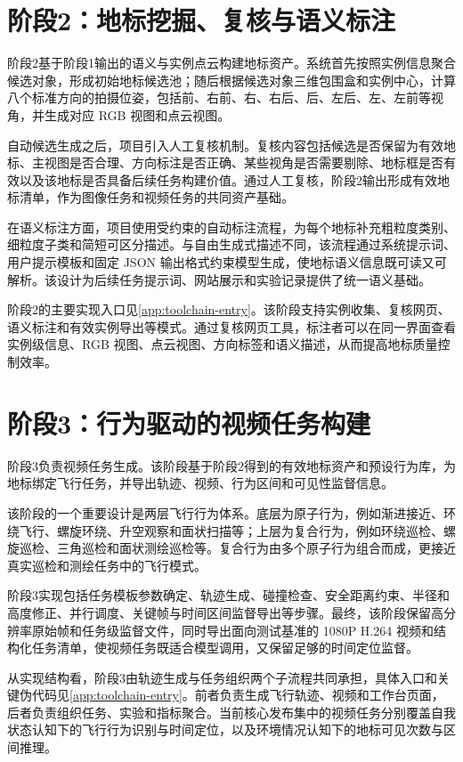 \section{阶段2：地标挖掘、复核与语义标注}

阶段2基于阶段1输出的语义与实例点云构建地标资产。系统首先按照实例信息聚合候选对象，形成初始地标候选池；随后根据候选对象三维包围盒和实例中心，计算八个标准方向的拍摄位姿，包括前、右前、右、右后、后、左后、左、左前等视角，并生成对应 RGB 视图和点云视图。

自动候选生成之后，项目引入人工复核机制。复核内容包括候选是否保留为有效地标、主视图是否合理、方向标注是否正确、某些视角是否需要剔除、地标框是否有效以及该地标是否具备后续任务构建价值。通过人工复核，阶段2输出形成有效地标清单，作为图像任务和视频任务的共同资产基础。

在语义标注方面，项目使用受约束的自动标注流程，为每个地标补充粗粒度类别、细粒度子类和简短可区分描述。与自由生成式描述不同，该流程通过系统提示词、用户提示模板和固定 JSON 输出格式约束模型生成，使地标语义信息既可读又可解析。该设计为后续任务提示词、网站展示和实验记录提供了统一语义基础。

阶段2的主要实现入口见\autoref{app:toolchain-entry}。该阶段支持实例收集、复核网页、语义标注和有效实例导出等模式。通过复核网页工具，标注者可以在同一界面查看实例级信息、RGB 视图、点云视图、方向标签和语义描述，从而提高地标质量控制效率。

\section{阶段3：行为驱动的视频任务构建}

阶段3负责视频任务生成。该阶段基于阶段2得到的有效地标资产和预设行为库，为地标绑定飞行任务，并导出轨迹、视频、行为区间和可见性监督信息。

该阶段的一个重要设计是两层飞行行为体系。底层为原子行为，例如渐进接近、环绕飞行、螺旋环绕、升空观察和面状扫描等；上层为复合行为，例如环绕巡检、螺旋巡检、三角巡检和面状测绘巡检等。复合行为由多个原子行为组合而成，更接近真实巡检和测绘任务中的飞行模式。

阶段3实现包括任务模板参数确定、轨迹生成、碰撞检查、安全距离约束、半径和高度修正、并行调度、关键帧与时间区间监督导出等步骤。最终，该阶段保留高分辨率原始帧和任务级监督文件，同时导出面向测试基准的 1080P H.264 视频和结构化任务清单，使视频任务既适合模型调用，又保留足够的时间定位监督。

从实现结构看，阶段3由轨迹生成与任务组织两个子流程共同承担，具体入口和关键伪代码见\autoref{app:toolchain-entry}。前者负责生成飞行轨迹、视频和工作台页面，后者负责组织任务、实验和指标聚合。当前核心发布集中的视频任务分别覆盖自我状态认知下的飞行行为识别与时间定位，以及环境情况认知下的地标可见次数与区间推理。

